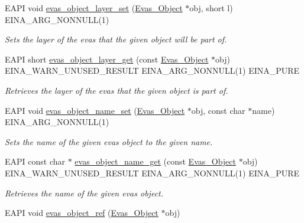 \begin{DoxyCompactItemize}
EAPI void \hyperlink{group__Evas__Object__Group__Basic_gab48bd3ad20b6663aa5756823edb02038}{evas\_\-object\_\-layer\_\-set} (\hyperlink{group__Evas__Object__Group_ga9e19e6dd1f517a0ba437c0114d3e7c97}{Evas\_\-Object} $\ast$obj, short l) EINA\_\-ARG\_\-NONNULL(1)
\begin{DoxyCompactList}\small\item\em Sets the layer of the evas that the given object will be part of. \item\end{DoxyCompactList}\item 
EAPI short \hyperlink{group__Evas__Object__Group__Basic_ga13cb52d23911b6c701dbb5f1ee3f65f4}{evas\_\-object\_\-layer\_\-get} (const \hyperlink{group__Evas__Object__Group_ga9e19e6dd1f517a0ba437c0114d3e7c97}{Evas\_\-Object} $\ast$obj) EINA\_\-WARN\_\-UNUSED\_\-RESULT EINA\_\-ARG\_\-NONNULL(1) EINA\_\-PURE
\begin{DoxyCompactList}\small\item\em Retrieves the layer of the evas that the given object is part of. \item\end{DoxyCompactList}\item 
EAPI void \hyperlink{group__Evas__Object__Group__Basic_ga4b6eee1edde61389b5ca9df911de60d8}{evas\_\-object\_\-name\_\-set} (\hyperlink{group__Evas__Object__Group_ga9e19e6dd1f517a0ba437c0114d3e7c97}{Evas\_\-Object} $\ast$obj, const char $\ast$name) EINA\_\-ARG\_\-NONNULL(1)
\begin{DoxyCompactList}\small\item\em Sets the name of the given evas object to the given name. \item\end{DoxyCompactList}\item 
EAPI const char $\ast$ \hyperlink{group__Evas__Object__Group__Basic_gac34b593d79bfd9284787ddbb43486edd}{evas\_\-object\_\-name\_\-get} (const \hyperlink{group__Evas__Object__Group_ga9e19e6dd1f517a0ba437c0114d3e7c97}{Evas\_\-Object} $\ast$obj) EINA\_\-WARN\_\-UNUSED\_\-RESULT EINA\_\-ARG\_\-NONNULL(1) EINA\_\-PURE
\begin{DoxyCompactList}\small\item\em Retrieves the name of the given evas object. \item\end{DoxyCompactList}\item 
EAPI void \hyperlink{group__Evas__Object__Group__Basic_gaa22895e88e2cb157b9c38a6d3ce10723}{evas\_\-object\_\-ref} (\hyperlink{group__Evas__Object__Group_ga9e19e6dd1f517a0ba437c0114d3e7c97}{Evas\_\-Object} $\ast$obj)

\end{DoxyCompactItemize}
